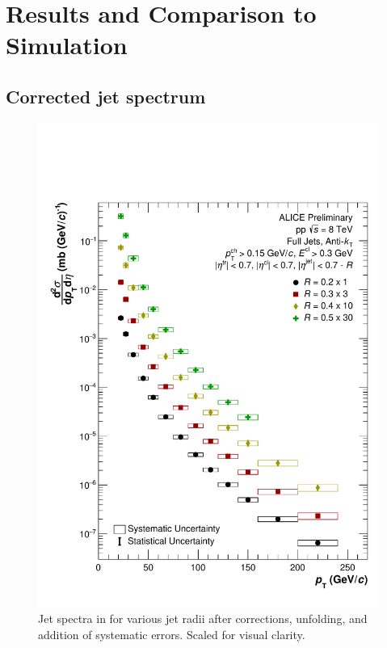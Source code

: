\section{Results and Comparison to Simulation}
\label{chap:results}

\subsection{Corrected jet spectrum}
\label{sec:corrJetSpectrum}

\begin{figure}
    \centering
    \includegraphics[width=15cm]{figures/FinalResults/Bayes_reg6.pdf}
    \caption{Jet spectra in \pp for various jet radii after corrections, unfolding, and addition of systematic errors. Scaled for visual clarity.}
    \label{fig:finalSpectra}
\end{figure}

